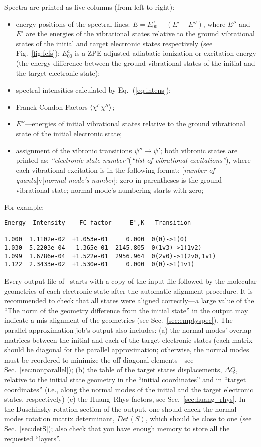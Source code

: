 \documentclass[11pt]{article}
\begin{document}
Spectra are printed as five columns (from left to right):
\begin{itemize}
\item energy positions of the spectral lines: $E=E^a_{00}+(E'-E'')$, where $E''$ and $E'$ are the energies
of the vibrational states relative to the ground vibrational states of the initial and target
electronic states respectively (see Fig.~\ref{fig:fcfs}); 
$E^a_{00}$ is a ZPE-adjusted adiabatic ionization or excitation energy 
(the energy difference between the ground vibrational states of the initial and the target electronic state);
\item spectral intensities calculated by Eq.~(\ref{eq:intens});
\item Franck-Condon Factors $\langle \chi '|\chi''\rangle$;
\item $E''$---energies of initial vibrational states relative to the ground vibrational state 
of the initial electronic state;
\item assignment of the vibronic transitions $\psi''\to\psi '$; both vibronic states are
printed as: {\em ``electronic state number''}({\em``list of vibrational excitations''}), 
where each vibrational excitation is in the following format: [{\em number of quanta}]v[{\em normal mode's number}];
zero in parentheses is the ground vibrational state; normal mode's numbering starts with zero;
\end{itemize}

For example:
\begin{lstlisting}[frame=single,framerule=0pt]
Energy  Intensity    FC factor     E",K   Transition

1.000  1.1102e-02  +1.053e-01     0.000  0(0)->1(0)
1.030  5.2203e-04  -1.365e-01  2145.805  0(1v3)->1(1v2)
1.099  1.6786e-04  +1.522e-01  2956.964  0(2v0)->1(2v0,1v1)
1.122  2.3433e-02  +1.530e-01     0.000  0(0)->1(1v1)
\end{lstlisting}

Every output file of \ezFCF\
starts with a copy of the input \xml file followed by the 
molecular geometries of each electronic state after the automatic alignment procedure. 
It is recommended to check that all states were aligned correctly---a large 
value of the ``The norm of the geometry difference from the initial state'' in the output
may indicate a mis-alignment of the geometries (see Sec.~\ref{sec:emptyspec}).
The parallel approximation job's output also includes: 
(a) the normal modes' overlap matrices between the initial and each of the
target electronic states (each matrix should be diagonal for the parallel approximation;
otherwise, the normal modes must be reordered to minimize the off diagonal elements---see 
Sec.~\ref{sec:nonparallel});
(b) the table of the target states displacements, 
$\Delta Q$, relative to the initial state geometry in the ``initial coordinates''
and in ``target coordinates'' (i.e., along the normal modes of the initial and the target electronic states, respectively)
(c) the Huang--Rhys factors, see Sec.~\ref{sec:huang_rhys}.
In the Duschinsky rotation section of the output, one should check the normal modes rotation matrix determinant,
$Det(S)$, which should be close to one (see Sec.~\ref{sec:detS}); also check that you have enough
memory to store all the requested ``layers''. 
\end{document}
